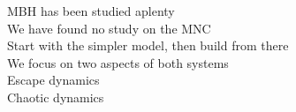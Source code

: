 \documentclass[preview]{standalone}
\begin{document}
MBH has been studied aplenty\\We have found no study on the MNC\\Start with the simpler model, then build from there\\We focus on two aspects of both systems\\Escape dynamics\\Chaotic dynamics\\
\end{document}
